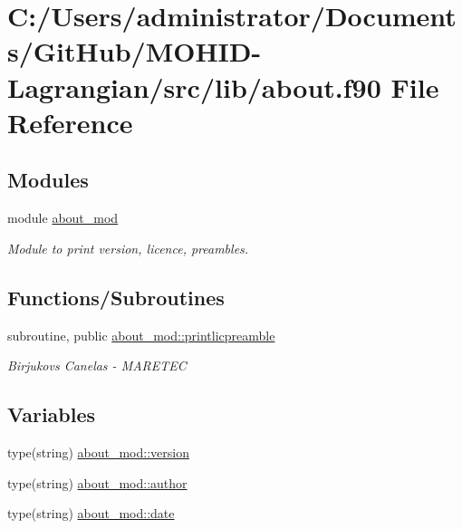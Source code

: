 \hypertarget{about_8f90}{}\section{C\+:/\+Users/administrator/\+Documents/\+Git\+Hub/\+M\+O\+H\+I\+D-\/\+Lagrangian/src/lib/about.f90 File Reference}
\label{about_8f90}
\subsection*{Modules}
\begin{DoxyCompactItemize}
\item 
module \hyperlink{namespaceabout__mod}{about\+\_\+mod}
\begin{DoxyCompactList}\small\item\em Module to print version, licence, preambles. \end{DoxyCompactList}\end{DoxyCompactItemize}
\subsection*{Functions/\+Subroutines}
\begin{DoxyCompactItemize}
\item 
subroutine, public \hyperlink{namespaceabout__mod_a9fb866e1576b843b42649d84b80f4b52}{about\+\_\+mod\+::printlicpreamble}
\begin{DoxyCompactList}\small\item\em Birjukovs Canelas -\/ M\+A\+R\+E\+T\+EC \end{DoxyCompactList}\end{DoxyCompactItemize}
\subsection*{Variables}
\begin{DoxyCompactItemize}
\item 
type(string) \hyperlink{namespaceabout__mod_af0051041c5a98e3eb7284580236db3a0}{about\+\_\+mod\+::version}
\item 
type(string) \hyperlink{namespaceabout__mod_a7c3a72ae7ba5fc7d8a4bf133605f58c3}{about\+\_\+mod\+::author}
\item 
type(string) \hyperlink{namespaceabout__mod_aaac12f65380fb0f10916b3744d9e5a0b}{about\+\_\+mod\+::date}
\end{DoxyCompactItemize}
